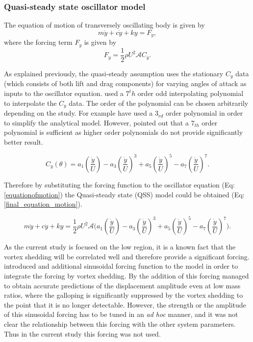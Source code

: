 

\subsubsection*{Quasi-steady state oscillator model}

The equation of motion of transversely oscillating body is given by 
\begin{equation}
\label{equationofmotion}
m\ddot{y}+c\dot{y}+ky=F_y,
\end{equation}
where the forcing term $F_y$ is given by
\begin{equation}
\label{lift equation}
F_y=\frac{1}{2}\rho U^2\mathcal{A}C_y.
\end{equation}

As explained previously, the quasi-steady assumption uses the stationary $C_y$ data (which consists of both lift and drag components) for varying angles of attack as inputs to the oscillator equation.\citet{Parkinson1964} used a $7^th$ order odd interpolating polynomial to interpolate the $C_y$ data. The order of the polynomial can be chosen arbitrarily depending on the study. For example \citet{Barrero-Gil2009,Barrero-Gil2010a} have used a $3_{rd}$ order polynomial in order to simplify the analytical model. However, \citet{Ng2005} pointed out that a $7_{th}$ order polynomial is sufficient as higher order polynomials do not provide significantly better result.    

\begin{equation}
\label{cy ploynomial}
C_y(\theta)=a_1\left(\frac{\dot{y}}{U}\right)-a_3\left(\frac{\dot{y}}{U}\right)^3+a_5\left(\frac{\dot{y}}{U}\right)^5-a_7\left(\frac{\dot{y}}{U}\right)^7.
\end{equation}

Therefore by substituting the forcing function to the oscillator equation (Eq:\ref{equationofmotion}) the Quasi-steady state (QSS) model could be obtained (Eq:\ref{final_equation_motion}). 

\begin{equation}
\label{final_equation_motion}
m\ddot{y}{+}c\dot{y}{+}ky{=}\frac{1}{2}\rho U^2 \mathcal {A} \Bigg(a_1\left(\frac{\dot{y}}{U}\right){-}a_3\left(\frac{\dot{y}}{U}\right)^3{+}a_5\left(\frac{\dot{y}}{U}\right)^5{-}a_7\left(\frac{\dot{y}}{U}\right)^7 \Bigg).
\end{equation}

As the current study is focused on the low \reynoldsnumber region, it is a known fact that the vortex shedding will be correlated well and therefore provide a significant forcing. \citet{Joly2012} introduced and additional sinusoidal forcing function to the model in order to integrate the forcing by vortex shedding. By the addition of this forcing \citet{Joly2012} managed to obtain accurate predictions of the displacement amplitude even at low mass ratios, where the galloping is significantly suppressed by the vortex shedding to the point that it is no longer detectable. However, the strength or the amplitude of this sinusoidal forcing has to be tuned in an \emph{ad hoc} manner, and it was not clear the relationship between this forcing with the other system parameters. Thus in the current study this forcing was not used.

